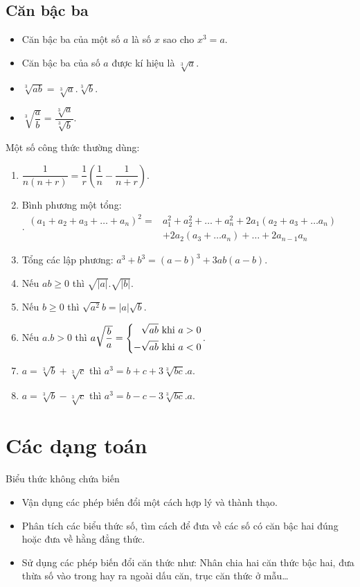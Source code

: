 \subsection{Căn bậc ba}
\begin{itemize}
	\item Căn bậc ba của một số $a$ là số $x$ sao cho $x^3 = a $.
	
	\item 	Căn bậc ba của số $a$ được kí hiệu là $\sqrt[3]{a}$.
	\item $\sqrt[3]{ab}=\sqrt[3]{a}.\sqrt[3]{b}$.
	\item $\sqrt[3]{\dfrac{a}{b}}=\dfrac{\sqrt[3]{a}}{\sqrt[3]{b}}$.	
	
\end{itemize}

Một số công thức thường dùng:
\begin{enumerate}[$\diamond$]  
	\item $\dfrac{1}{n(n+r)} = \dfrac{1}{r}\left(\dfrac{1}{n}-\dfrac{1}{n+r}\right)$.
	\item Bình phương một tổng:\\
	$.
	\begin{aligned} (a_1+a_2+a_3+\ldots +a_n)^2 = &a_1^2+a_2^2+\ldots + a_n^2 + 2a_1(a_2+a_3+\ldots a_n)\\
	& + 2a_2(a_3+\ldots a_n)+\ldots +2a_{n-1}a_n
	\end{aligned}	
	$	   
	\item Tổng các lập phương: $a^3+b^3 = (a-b)^3+3ab(a-b)$.
	\item Nếu $ab\geq 0$ thì $\sqrt{|a|}.\sqrt{|b|}$.
	\item Nếu $b\geq 0$ thì $\sqrt{a^2}b = |a|\sqrt{b}$.
	\item Nếu $a.b > 0$ thì $a\sqrt{\dfrac{b}{a}} = \left\{\begin{aligned}\sqrt{ab} \mbox{ khi } a > 0\\ -\sqrt{ab} \mbox{ khi } a < 0\end{aligned}\right.$.
	\item $a=\sqrt[3]{b}+\sqrt[3]{c}$ thì $a^3 = b+c+3\sqrt[3]{bc}.a$.
	\item $a=\sqrt[3]{b}-\sqrt[3]{c}$ thì $a^3 = b-c-3\sqrt[3]{bc}.a$.
\end{enumerate}

\section{Các dạng toán}

\begin{dang}{Biểu thức không chứa biến}
	\begin{itemize}
		\item  Vận dụng các phép biến đổi một cách hợp lý và thành thạo.
		\item  Phân tích các biểu thức số, tìm cách để đưa về các số có căn bậc hai đúng hoặc đưa về hằng đẳng thức.
		\item Sử dụng các phép biến đổi căn thức như: Nhân chia hai căn thức bậc hai, đưa thừa số vào trong hay ra ngoài dấu căn, trục căn thức ở mẫu…
	\end{itemize}
\end{dang}

